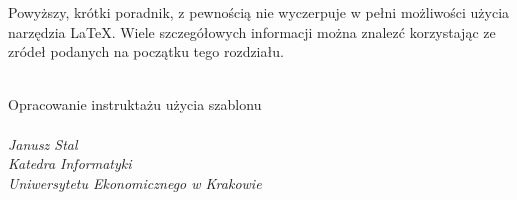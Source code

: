 Powyższy, krótki poradnik, z pewnością nie wyczerpuje w pełni możliwości użycia narzędzia \LaTeX. Wiele szczegółowych informacji można znalezć korzystając ze zródeł podanych na początku tego rozdziału.



\begin{flushright}
~\\
Opracowanie instruktażu użycia szablonu\\
~\\
\textit{Janusz Stal\\
Katedra Informatyki\\
Uniwersytetu Ekonomicznego w Krakowie\\
}\end{flushright}


